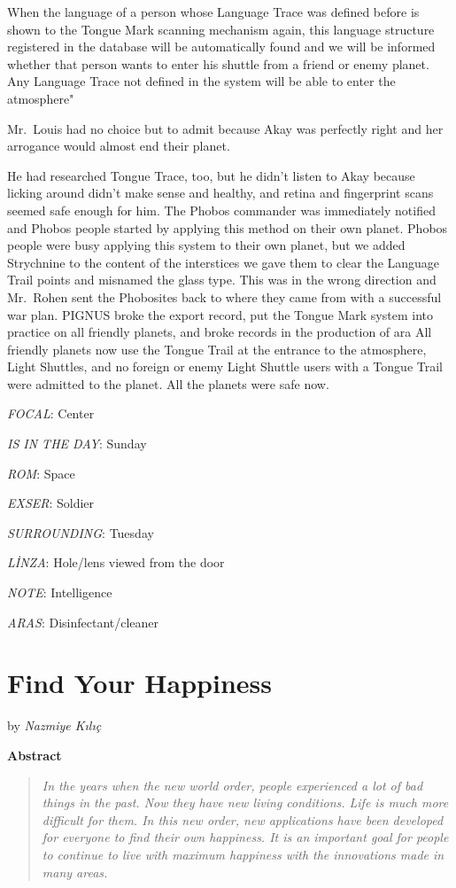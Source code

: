 \documentclass[]{book}
\begin{document}
When the language of a person whose Language Trace was defined before is shown to the Tongue Mark scanning mechanism again, this language structure registered in the database will be automatically found and we will be informed whether that person wants to enter his shuttle from a friend or enemy planet. Any Language Trace not defined in the system will be able to enter the atmosphere"

Mr.~Louis had no choice but to admit because Akay was perfectly right and her arrogance would almost end their planet.

He had researched Tongue Trace, too, but he didn't listen to Akay because licking around didn't make sense and healthy, and retina and fingerprint scans seemed safe enough for him. The Phobos commander was immediately notified and Phobos people started by applying this method on their own planet. Phobos people were busy applying this system to their own planet, but we added Strychnine to the content of the interstices we gave them to clear the Language Trail points and misnamed the glass type. This was in the wrong direction and Mr.~Rohen sent the Phobosites back to where they came from with a successful war plan. PIGNUS broke the export record, put the Tongue Mark system into practice on all friendly planets, and broke records in the production of ara All friendly planets now use the Tongue Trail at the entrance to the atmosphere, Light Shuttles, and no foreign or enemy Light Shuttle users with a Tongue Trail were admitted to the planet. All the planets were safe now.

\emph{FOCAL}: Center

\emph{IS IN THE DAY}: Sunday

\emph{ROM}: Space

\emph{EXSER}: Soldier

\emph{SURROUNDING}: Tuesday

\emph{LİNZA}: Hole/lens viewed from the door

\emph{NOTE}: Intelligence

\emph{ARAS}: Disinfectant/cleaner

\hypertarget{find-your-happiness}{%
\chapter{Find Your Happiness}\label{find-your-happiness}}

by \emph{Nazmiye Kılıç}

\textbf{Abstract}

\begin{quote}
\emph{In the years when the new world order, people experienced a lot of bad things in the past. Now they have new living conditions. Life is much more difficult for them. In this new order, new applications have been developed for everyone to find their own happiness. It is an important goal for people to continue to live with maximum happiness with the innovations made in many areas.}
\end{quote}
\end{document}
